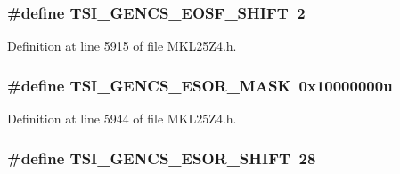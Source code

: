 \subsubsection[{\texorpdfstring{T\+S\+I\+\_\+\+G\+E\+N\+C\+S\+\_\+\+E\+O\+S\+F\+\_\+\+S\+H\+I\+FT}{TSI_GENCS_EOSF_SHIFT}}]{\setlength{\rightskip}{0pt plus 5cm}\#define T\+S\+I\+\_\+\+G\+E\+N\+C\+S\+\_\+\+E\+O\+S\+F\+\_\+\+S\+H\+I\+FT~2}\hypertarget{group___t_s_i___register___masks_ga9a2e8c68bfb60312ebdeea4f069d9086}{}\label{group___t_s_i___register___masks_ga9a2e8c68bfb60312ebdeea4f069d9086}


Definition at line 5915 of file M\+K\+L25\+Z4.\+h.

\subsubsection[{\texorpdfstring{T\+S\+I\+\_\+\+G\+E\+N\+C\+S\+\_\+\+E\+S\+O\+R\+\_\+\+M\+A\+SK}{TSI_GENCS_ESOR_MASK}}]{\setlength{\rightskip}{0pt plus 5cm}\#define T\+S\+I\+\_\+\+G\+E\+N\+C\+S\+\_\+\+E\+S\+O\+R\+\_\+\+M\+A\+SK~0x10000000u}\hypertarget{group___t_s_i___register___masks_ga1036a1740b9fd85ac9a7ee8c7b31fbc5}{}\label{group___t_s_i___register___masks_ga1036a1740b9fd85ac9a7ee8c7b31fbc5}


Definition at line 5944 of file M\+K\+L25\+Z4.\+h.

\subsubsection[{\texorpdfstring{T\+S\+I\+\_\+\+G\+E\+N\+C\+S\+\_\+\+E\+S\+O\+R\+\_\+\+S\+H\+I\+FT}{TSI_GENCS_ESOR_SHIFT}}]{\setlength{\rightskip}{0pt plus 5cm}\#define T\+S\+I\+\_\+\+G\+E\+N\+C\+S\+\_\+\+E\+S\+O\+R\+\_\+\+S\+H\+I\+FT~28}\hypertarget{group___t_s_i___register___masks_ga2cdb34b848a822afc459c74893200fbb}{}\label{group___t_s_i___register___masks_ga2cdb34b848a822afc459c74893200fbb}


